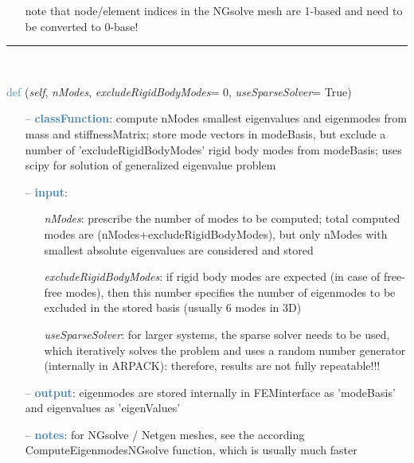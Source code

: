 \begin{itemize}[leftmargin=1.4cm]
\begin{itemize}[leftmargin=1.4cm]
\begin{itemize}[leftmargin=0.5cm]
\begin{itemize}[leftmargin=1.4cm]
\begin{itemize}[leftmargin=1.4cm]
\begin{itemize}[leftmargin=0.5cm]
\begin{itemize}[leftmargin=0.7cm]
\begin{itemize}[leftmargin=1.2cm]
    \item[]   note that node/element indices in the NGsolve mesh are 1-based and need to be converted to 0-base!
  \end{itemize}
\vspace{12pt}\end{itemize}
%
\noindent\rule{8cm}{0.75pt}\vspace{1pt} \\ 
\begin{flushleft}
\noindent \textcolor{steelblue}{def {\bf {}}}\label{sec:FEM:FEMinterface:ComputeEigenmodes}
({\it self}, {\it nModes}, {\it excludeRigidBodyModes}= 0, {\it useSparseSolver}= True)
\end{flushleft}
\setlength{\itemindent}{0.7cm}
\begin{itemize}[leftmargin=0.7cm]
  \item[--]  \textcolor{steelblue}{\bf classFunction}: compute nModes smallest eigenvalues and eigenmodes from mass and stiffnessMatrix; store mode vectors in modeBasis, but exclude a number of 'excludeRigidBodyModes' rigid body modes from modeBasis; uses scipy for solution of generalized eigenvalue problem  \item[--]  \textcolor{steelblue}{\bf input}: \vspace{-6pt}
  \begin{itemize}[leftmargin=1.2cm]
\setlength{\itemindent}{-0.7cm}
    \item[] {\it nModes}: prescribe the number of modes to be computed; total computed modes are  (nModes+excludeRigidBodyModes), but only nModes with smallest absolute eigenvalues are considered and stored
    \item[] {\it   excludeRigidBodyModes}: if rigid body modes are expected (in case of free-free modes), then this number specifies the number of eigenmodes to be excluded in the stored basis (usually 6 modes in 3D)
    \item[] {\it   useSparseSolver}: for larger systems, the sparse solver needs to be used, which iteratively solves the problem and uses a random number generator (internally in ARPACK): therefore, results are not fully repeatable!!!
  \end{itemize}
  \item[--]  \textcolor{steelblue}{\bf output}: eigenmodes are stored internally in FEMinterface as 'modeBasis' and eigenvalues as 'eigenValues'  \item[--]  \textcolor{steelblue}{\bf notes}: for NGsolve / Netgen meshes, see the according ComputeEigenmodesNGsolve function, which is usually much faster\vspace{12pt}\end{itemize}

\end{itemize}
\end{itemize}
\end{itemize}
\end{itemize}
\end{itemize}
\end{itemize}
